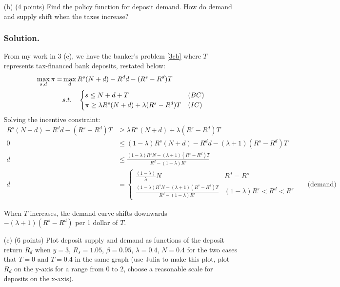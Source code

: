 \documentclass[12pt]{article}
\begin{document}
\begin{enumerate}
\begin{enumerate}
    
    
    
        \item[(b)] {(4 points)} Find the policy function for deposit demand. How do demand and supply shift when the taxes increase?
        \subsubsection*{Solution.}

        From my work in 3 (c), we have the banker's problem  \eqref{3cb} where $T$ represents tax-financed bank deposits, restated below: 
        \begin{align*}
                \max_{s,d}\pi =&\max_{d}  R^s(N+d) - R^dd - (R^s-R^d)T  
                \\ & s.t. \quad \begin{cases}
                    s \leq N + d + T & (BC)
                    \\ \pi \geq \lambda R^s(N+d) + \lambda (R^s - R^d)T & (IC)
                \end{cases}\notag 
        \end{align*}
        Solving the incentive constraint: 
        \begin{align*}
             R^s(N+d) - R^dd - (R^s-R^d)T&\geq \lambda R^s(N+d) + \lambda (R^s - R^d)T
            \\ 0 &\leq  \left(1-\lambda\right)R^{s}(N+d)-R^{d}d-\left(\lambda+1\right)(R^{s}-R^{d})T
            \\ d &\leq \frac{\left(1-\lambda\right)R^{s}N-\left(\lambda+1\right)(R^{s}-R^{d})T}{R^{d}-\left(1-\lambda\right)R^{s}}
            \\d &= \begin{cases}
                  \frac{(1-\lambda)}{\lambda}N & R^d = R^s 
                 \\ \frac{\left(1-\lambda\right)R^{s}N-\left(\lambda+1\right)(R^{s}-R^{d})T}{R^{d}-\left(1-\lambda\right)R^{s}} & (1-\lambda)R^s < R^d < R^s
             \end{cases} && \text{(demand)}
        \end{align*}

        When $T$ increases, the demand curve shifts downwards $-\left(\lambda+1\right)(R^{s}-R^{d})$ per 1 dollar of $T$. 

        \bigskip
        \item[(c)] {(6 points)} Plot deposit supply and demand as functions of the deposit return $R_d$ when $y = 3$, $R_s = 1.05$, $\beta = 0.95$, $\lambda = 0.4$, $N = 0.4$ for the two cases that $T = 0$ and $T = 0.4$ in the same graph (use Julia to make this plot, plot $R_d$ on the y-axis for a range from 0 to 2, choose a reasonable scale for deposits on the x-axis).

\end{enumerate}
\end{enumerate}
\end{document}
